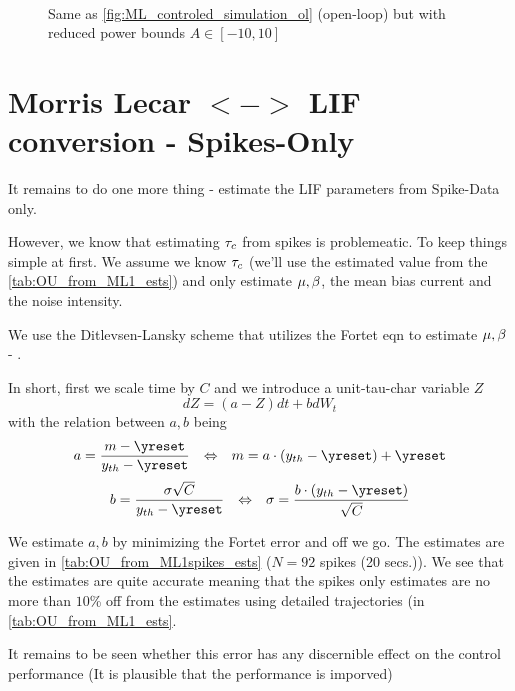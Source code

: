 \documentclass{article}
\begin{document}
\begin{figure}[h] 
\begin{center}
\\
\caption[labelInTOC]{Same as \cref{fig:ML_controled_simulation_ol}
(open-loop) but with reduced power bounds $A \in [-10,10]$}
\label{fig:ML_controled_simulation_ol_A10}
\end{center}
\end{figure}

\clearpage

\section{Morris Lecar $<->$ LIF conversion - Spikes-Only}
It remains to do one more thing - estimate the LIF parameters from Spike-Data
only. 

However, we know that estimating ${ \tau_{c} }$ from spikes is problemeatic. To keep
things simple at first. We assume we know ${ \tau_{c} }$ (we'll use the estimated value
from the \cref{tab:OU_from_ML1_ests}) and only estimate ${\mu }, {\beta}$, the mean
bias current and the noise intensity.

We use the Ditlevsen-Lansky scheme that utilizes the Fortet eqn to estimate
${\mu }, {\beta}$ - \cite{Ditlevsen2007}.

In short, first we scale time by $C$ and we introduce a unit-tau-char variable
$Z$
$$
dZ = (a- Z) dt + bdW_t$$
with the relation between $a,b$ being
$$
a = \frac{m - \yreset}{\yth - \yreset} 
	\quad \iff \quad 
		 m = a \cdot (\yth - \yreset) + \yreset
$$
$$
b  = \frac{\sigma \sqrt{C}}{\yth - \yreset} 
	\quad \iff \quad  
		\s = \frac{b \cdot (\yth - \yreset)}{\sqrt{C}} 
$$

We estimate $a,b$ by minimizing the Fortet error and off we go. The estimates
are given in \cref{tab:OU_from_ML1spikes_ests} ($N=92$ spikes (20 secs.)). We
see that the estimates are quite accurate meaning that the spikes only estimates are no more
than $10$\% off from the estimates using detailed trajectories (in
\cref{tab:OU_from_ML1_ests}.

It remains to be seen whether this error has any discernible effect on the
control performance (It is plausible that the performance is imporved)
\end{document}
